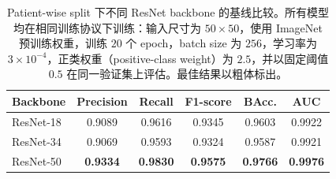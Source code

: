 \begin{table}[t]
    \centering
    \small
    \setlength{\tabcolsep}{4pt}
    \caption{Patient-wise split 下不同 ResNet backbone 的基线比较。所有模型均在相同训练协议下训练：输入尺寸为 $50 \times 50$，使用 ImageNet 预训练权重，训练 $20$ 个 epoch，batch size 为 $256$，学习率为 $3\times10^{-4}$，正类权重（positive-class weight）为 $2.5$，并以固定阈值 $0.5$ 在同一验证集上评估。最佳结果以粗体标出。}
    \label{tab:backbone_baseline_comparison}
    \begin{tabular*}{\textwidth}{@{\extracolsep{\fill}}lccccc@{}}
        \toprule
        Backbone & Precision & Recall & F1-score & BAcc. & AUC \\
        \midrule
        ResNet-18 & 0.9089 & 0.9616 & 0.9345 & 0.9603 & 0.9922 \\
        ResNet-34 & 0.9069 & 0.9593 & 0.9324 & 0.9587 & 0.9921 \\
        ResNet-50 & \textbf{0.9334} & \textbf{0.9830} & \textbf{0.9575} & \textbf{0.9766} & \textbf{0.9976} \\
        \bottomrule
    \end{tabular*}
\end{table}
